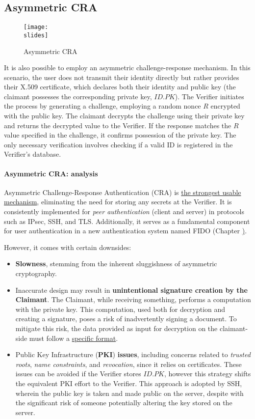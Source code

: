 \subsection{Asymmetric CRA}
\begin{figure}[h]
  \centering
  \texttt{[image: \\slides]}
  \caption{Asymmetric CRA}
\end{figure}
It is also possible to employ an asymmetric challenge-response mechanism. In this scenario, the user does not transmit their identity directly but rather provides their X.509 certificate, which declares both their identity and public key (the claimant possesses the corresponding private key, $ID.PK$). The Verifier initiates the process by generating a challenge, employing a random nonce \(R\) encrypted with the public key. The claimant decrypts the challenge using their private key and returns the decrypted value to the Verifier. If the response matches the \(R\) value specified in the challenge, it confirms possession of the private key. The only necessary verification involves checking if a valid ID is registered in the Verifier's database.

\paragraph{Asymmetric CRA: analysis}
Asymmetric Challenge-Response Authentication (CRA) is \ul{the strongest usable mechanism}, eliminating the need for storing any secrets at the Verifier. It is consistently implemented for \textit{peer authentication} (client and server) in protocols such as IPsec, SSH, and TLS. Additionally, it serves as a fundamental component for user authentication in a new authentication system named FIDO (Chapter \href{chap:fido}).

However, it comes with certain downsides:
\begin{itemize}
  \item \textbf{Slowness}, stemming from the inherent sluggishness of asymmetric cryptography.
  \item Inaccurate design may result in \textbf{unintentional signature creation by the Claimant}.
        The Claimant, while receiving something, performs a computation with the private key.
        This computation, used both for decryption and creating a signature, poses a risk of inadvertently signing a document. To mitigate this risk, the data provided as input for decryption on the claimant-side must follow a \underline{specific format}.
  \item Public Key Infrastructure (\textbf{PKI}) \textbf{issues}, including concerns related to \textit{trusted roots}, \textit{name constraints}, and \textit{revocation}, since it relies on certificates. These issues can be avoided if the Verifier stores \(ID.PK\), however this strategy shifts the equivalent PKI effort to the Verifier.
        This approach is adopted by SSH, wherein the public key is taken and made public on the server, despite with the significant risk of someone potentially altering the key stored on the server.
\end{itemize}


